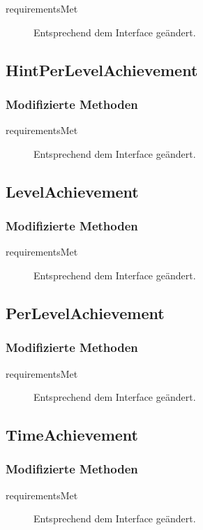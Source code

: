 \begin{description}
	\item[requirementsMet]
	Entsprechend dem Interface geändert.
\end{description}

\subsection{HintPerLevelAchievement}

\subsubsection{Modifizierte Methoden}

\begin{description}
	\item[requirementsMet]
	Entsprechend dem Interface geändert.
\end{description}

\subsection{LevelAchievement}

\subsubsection{Modifizierte Methoden}

\begin{description}
	\item[requirementsMet]
	Entsprechend dem Interface geändert.
\end{description}

\subsection{PerLevelAchievement}

\subsubsection{Modifizierte Methoden}

\begin{description}
	\item[requirementsMet]
	Entsprechend dem Interface geändert.
\end{description}

\subsection{TimeAchievement}

\subsubsection{Modifizierte Methoden}

\begin{description}
	\item[requirementsMet]
	Entsprechend dem Interface geändert.
\end{description}



